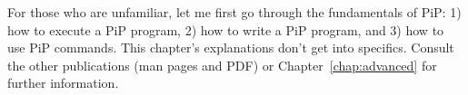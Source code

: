 
For those who are unfamiliar, let me first go through the fundamentals
of PiP: 1) how to execute a PiP program, 2) how to write a PiP
program, and 3) how to use PiP commands. This chapter's explanations
don't get into specifics. Consult the other publications (man pages
and PDF) or Chapter~\ref{chap:advanced} for further information.
